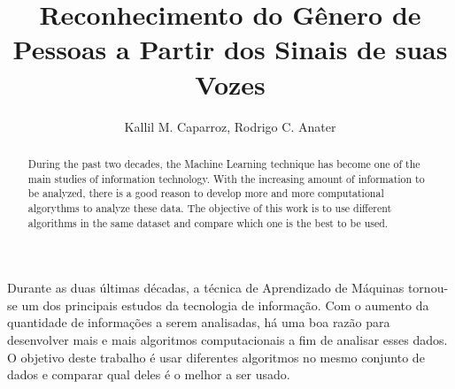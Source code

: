 \documentclass[
12pt,				%
openright,			%
twoside,			%
a4paper,			%
sumario=tradicional, %
hidelinks,          %
num,				%
bibjustif,			%
brackets,			%
english,			%
brazil				%
]{article}       %
\title{Reconhecimento do Gênero de Pessoas a Partir dos Sinais de suas Vozes}
\author{Kallil M. Caparroz\inst{1}, Rodrigo C. Anater\inst{2} }
\begin{document}
 

  \maketitle

\begin{abstract} 	
 	During the past two decades, the Machine Learning technique has become one of the main studies of information technology. With the increasing amount of information to be analyzed, there is a good reason to develop more and more computational algorythms to analyze these data. The objective of this work is to use different algorithms in the same dataset and compare which one is the best to be used.
\end{abstract}
     
\begin{resumo} 
 	Durante as duas últimas décadas, a técnica de Aprendizado de Máquinas tornou-se um dos principais estudos da tecnologia de informação. Com o aumento da quantidade de informações a serem analisadas, há uma boa razão para desenvolver mais e mais algoritmos computacionais a fim de analisar esses dados. O objetivo deste trabalho é usar diferentes algoritmos no mesmo conjunto de dados e comparar qual deles é o melhor a ser usado.   
\end{resumo}










\end{document}
